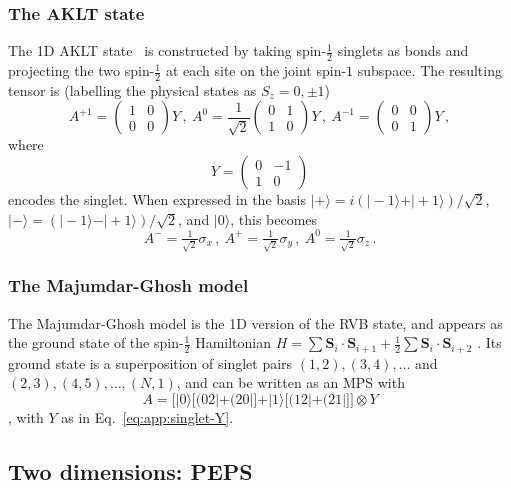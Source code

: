 \documentclass[rmp,aps,reprint,superscriptaddress,nobalancelastpage]{revtex4-1}
\newcommand{\ket}[1]{\vert#1\rangle}
\let\endignorethis\relax
\def\TOCstop{\addtocontents{toc}{\ignorethis}}
\def\TOCstart{\addtocontents{toc}{\endignorethis}}
\begin{document}
\subsubsection{The AKLT state} The 1D AKLT state~\cite*{affleck:aklt-prl} is  constructed by taking spin-$\tfrac12$ singlets as bonds and projecting the two spin-$\tfrac12$ at each site on the joint spin-$1$ subspace. The resulting tensor is (labelling the physical states as $S_z=0,\pm1$)
\[
    A^{+1}=\begin{pmatrix}1&0\\0&0\end{pmatrix}Y\,,
    \
    A^{0}=\frac{1}{\sqrt{2}}\begin{pmatrix}0&1\\1&0\end{pmatrix}Y\,,
    \
    A^{-1}=\begin{pmatrix}0&0\\0&1\end{pmatrix}Y\,,
\]
where
\begin{equation}
    \label{eq:app:singlet-Y}
    Y=\left(\begin{matrix}0&-1\\1&0\end{matrix}\right)
\end{equation}
encodes the singlet.
When expressed in the basis $\ket{+}=i(\ket{-1}+\ket{+1})/\sqrt{2}$,
$\ket{-}=(\ket{-1}-\ket{+1})/\sqrt{2}$,
and $\ket0$, this becomes
\[
    A^{-} = \tfrac{1}{\sqrt{2}}\sigma_x\,,\
    A^{+} = \tfrac{1}{\sqrt{2}}\sigma_y\,,\
    A^{0} = \tfrac{1}{\sqrt{2}}\sigma_z\,.
\]



\subsubsection{The Majumdar-Ghosh model} The Majumdar-Ghosh model
is the 1D version of the RVB state, and appears as the ground state of the spin-$\tfrac12$
Hamiltonian $H=\sum \bm S_i\cdot \bm S_{i+1} + \tfrac12
    \sum \bm S_i\cdot \bm S_{i+2}$
\cite{majumdar:majumdar-ghosh-model}. Its ground state is a superposition of singlet pairs $(1,2),(3,4),\dots$ and $(2,3),(4,5),\dots,(N,1)$, and can be written as an MPS with
\[
    A = \Big[\ket0\big[(02|+(20|\big] + \ket1\big[(12|+(21|\big]\Big]\otimes Y
\]
\cite{verstraete:comp-power-of-peps}, with $Y$ as in Eq.~\eqref{eq:app:singlet-Y}.





\TOCstart
\subsection{Two dimensions: PEPS}
\TOCstop
\end{document}
